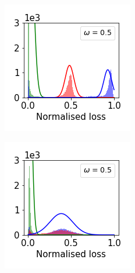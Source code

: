 \documentclass[12pt]{article}
\begin{document}
\begin{figure}[t]
\begin{subfigure}{.18\textwidth}
    \end{subfigure}
    \begin{subfigure}{.18\textwidth}
      \centering
      \includegraphics[width=\linewidth]{images/loss_dist/EDM_0.6_0.50_imagenet32.png} 
    \end{subfigure}
    \begin{subfigure}{.18\textwidth}
      \centering
      \includegraphics[width=\linewidth]{images/loss_dist/DM_0.6_0.50_cifar100.png} 

\end{subfigure}
\end{figure}
\end{document}
